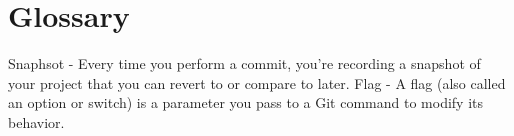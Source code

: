 \chapter*{Glossary}
Snaphsot - Every time you perform a commit, you’re recording a snapshot of your project that you can revert to or compare to later.\newline
Flag - A flag (also called an option or switch) is a parameter you pass to a Git command to modify its behavior.